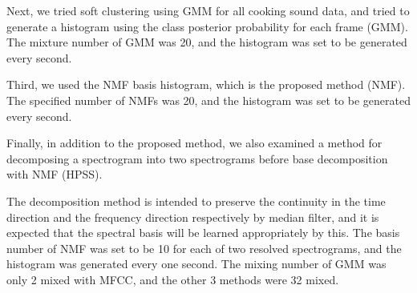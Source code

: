 \documentclass[sigconf,anonymous]{acmart}
\begin{document}
Next, we tried soft clustering using GMM for all cooking sound data, and tried to generate a histogram using the class posterior probability for each frame (GMM). The mixture number of GMM was 20, and the histogram was set to be generated every second.

Third, we used the NMF basis histogram, which is the proposed method (NMF). The specified number of NMFs was 20, and the histogram was set to be generated every second.

Finally, in addition to the proposed method, we also examined a method for decomposing a spectrogram into two spectrograms before base decomposition with NMF (HPSS).

The decomposition method is intended to preserve the continuity in the time direction and the frequency direction respectively by median filter, and it is expected that the spectral basis will be learned appropriately by this.
The basis number of NMF was set to be 10 for each of two resolved spectrograms, and the histogram was generated every one second.
The mixing number of GMM was only 2 mixed with MFCC, and the other 3 methods were 32 mixed.

\begin{table}[t]
  \centering
  \caption{MFCC results}
  \label{result1}
\end{table}
\end{document}
